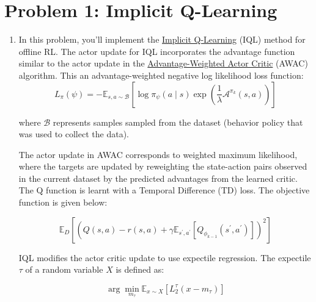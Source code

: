 \documentclass[12pt]{article}
\begin{document}
\section*{Problem 1: Implicit Q-Learning}
\begin{enumerate}
\item In this problem, you'll implement the \href{https://arxiv.org/abs/2110.06169}{Implicit Q-Learning} (IQL) method for offline RL. The actor update for IQL incorporates the advantage function similar to the actor update in the \href{https://arxiv.org/abs/2006.09359}{Advantage-Weighted Actor Critic} (AWAC) algorithm. This an advantage-weighted negative log likelihood loss function: 
\begin{equation}
    L_\pi(\psi)=-\mathbb{E}_{s, a \sim \mathcal{B}}\left[\log \pi_\psi(a \mid s) \exp \left(\frac{1}{\lambda} \mathcal{A}^{\pi_k}(s, a)\right)\right]
\end{equation}

where $\mathcal{B}$ represents samples sampled from the dataset (behavior policy that was used to collect the data). 

The actor update in AWAC corresponds to weighted maximum likelihood, where the targets are updated by reweighting the state-action pairs observed in the current dataset by the predicted advantages from the learned critic. The Q function is learnt with a Temporal Difference (TD) loss. The objective function is given below: 

\begin{equation}\label{eq:td_objective}
    \mathbb{E}_D\left[\left(Q(s, a)-r(s, a)+\gamma \mathbb{E}_{s^{\prime}, a^{\prime}}\left[Q_{\phi_{k-1}}\left(s^{\prime}, a^{\prime}\right)\right]\right)^2\right]
\end{equation}

IQL modifies the actor critic update to use expectile regression. The expectile $\tau$ of a random variable $X$ is defined as:

\begin{equation}
    \arg \min _{m_\tau} \mathbb{E}_{x \sim X}\left[L_2^\tau\left(x-m_\tau\right)\right]
\end{equation}


\end{enumerate}
\end{document}
